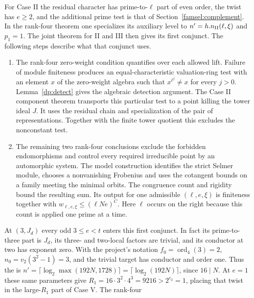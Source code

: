 For Case II the residual character has prime-to-\(\ell\) part of
even order, the twist has \(e\ge2\), and the additional prime test is
that of Section~\ref{famsel:complement}. In the rank-four theorem
one specializes its auxiliary level to \(n'=h.n_{\rm II}(\ell,\xi)\)
and \(p_1=1\). The joint theorem for II and III then gives its first
conjunct. The following steps describe what that conjunct uses.
\begin{enumerate}
\item The rank-four zero-weight condition quantifies over each
allowed lift. Failure of module finiteness produces an
equal-characteristic valuation-ring test with an element \(x\) of
the zero-weight algebra such that \(x^{\ell^j}\ne x\) for every
\(j>0\). Lemma~\ref{dp:detect} gives the algebraic detection
argument. The Case II component theorem transports this particular
test to a point killing the tower ideal \(J\). It uses the residual
chain and specialization of the pair of representations. Together
with the finite tower quotient this excludes the nonconstant test.
\item The remaining two rank-four conclusions exclude the forbidden
endomorphisms and control every required irreducible point by an
automorphic system. The model construction identifies the strict
Selmer module, chooses a nonvanishing Frobenius and uses the
cotangent bounds on a family meeting the minimal orbits. The
congruence count and rigidity bound the resulting sum. Its output
for one admissible \((\ell,e,\xi)\) is finiteness together with
\(w_{\ell,e,\xi}\le(\ell N e)^C\). Here \(\ell\) occurs on the
right because this count is applied one prime at a time.
\end{enumerate}
At \((3,J_d)\) every odd \(3\le e<t\) enters this first conjunct.
In fact its prime-to-three part is \(J_d\), its three- and two-local
factors are trivial, and its conductor at two has exponent zero.
With the project's notation \(f_0=\operatorname{ord}_{4}(3)=2\),
\(n_0=v_2(3^2-1)=3\), and the trivial target has conductor and order
one. Thus the
is \(n'=\lceil\log_2\max(192N,1728)\rceil=\lceil\log_2(192N)\rceil\),
since \(16\mid N\). At \(e=1\) these same parameters give
\(R_1=16\cdot3^2\cdot4^3=9216>2^{c_2}=1\), placing that twist
in the large-\(R_1\) part of Case V. The rank-four
